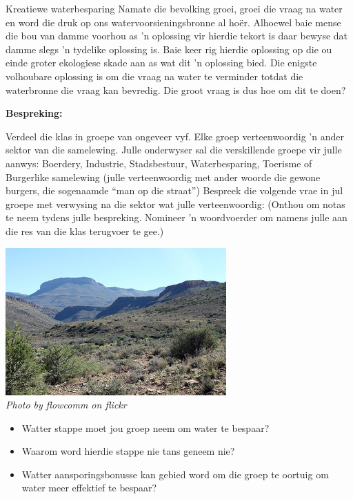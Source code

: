 \begin{groupdiscussion}{Kreatiewe waterbesparing}
\nopagebreak
\label{m38138*uid289435}Namate die bevolking groei, groei die vraag na water en word die druk op ons watervoorsieningsbronne al hoër. Alhoewel baie mense die bou van damme voorhou as  'n oplossing vir hierdie tekort is daar bewyse dat damme slegs  'n tydelike oplossing is. Baie keer rig hierdie oplossing op die ou einde groter ekologiese skade aan as wat dit  'n oplossing bied. Die enigste volhoubare oplossing is om die vraag na water te verminder totdat die waterbronne die vraag kan bevredig. Die groot vraag is dus hoe om dit te doen?\par
\label{m38138*uid5630}\textbf{Bespreking:}\\
\begin{minipage}{.6\textwidth}
\vspace{1em}
 Verdeel die klas in groepe van ongeveer vyf. Elke groep verteenwoordig  'n ander sektor van die samelewing. Julle onderwyser sal die verskillende groepe vir julle aanwys: Boerdery, Industrie, Stadsbestuur, Waterbesparing, Toerisme of Burgerlike samelewing (julle verteenwoordig met ander woorde die gewone burgers, die sogenaamde “man op die straat”) Bespreek die volgende vrae in jul groepe met verwysing na die sektor wat julle verteenwoordig: (Onthou om notas te neem tydens julle bespreking. Nomineer  'n woordvoerder om namens julle aan die res van die klas terugvoer te gee.)
\end{minipage}
\begin{minipage}{.4\textwidth}
 \begin{center}
  \includegraphics[width=.6\textwidth]{photos/karoo_flowcomm.jpg} \\
\textsl{Photo by flowcomm on flickr}
 \end{center}

\end{minipage}
\label{m38138*id342317}\begin{itemize}[noitemsep]
            \label{m38138*uid88}\item Watter stappe moet jou groep neem om water te bespaar?
\label{m38138*uid89}\item Waarom word hierdie stappe nie tans geneem nie?
\label{m38138*uid90}\item Watter aansporingsbonusse kan gebied word om die groep te oortuig om water meer effektief te bespaar?
\end{itemize}


\end{groupdiscussion}
